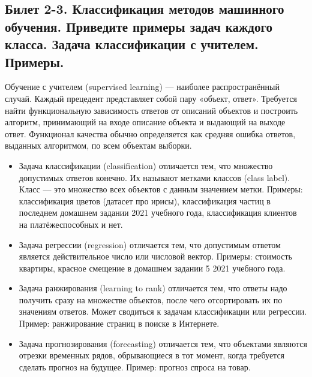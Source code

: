 \documentclass[a4paper, 12pt]{article}
\begin{document}
	\subsection*{Билет 2-3. Классификация методов машинного обучения. Приведите примеры задач каждого класса. Задача классификации с учителем. Примеры.}
	Обучение с учителем (supervised learning) — наиболее распространённый случай. Каждый прецедент представляет собой пару «объект, ответ». Требуется найти функциональную зависимость ответов от описаний объектов и построить алгоритм, принимающий на входе описание объекта и выдающий на выходе ответ. Функционал качества обычно определяется как средняя ошибка ответов, выданных алгоритмом, по всем объектам выборки.
	\begin{itemize}
	\item Задача классификации (classification) отличается тем, что множество допустимых ответов конечно. Их называют метками классов (class label). Класс — это множество всех объектов с данным значением метки. Примеры: классификация цветов (датасет про ирисы), классификация частиц в последнем домашнем задании 2021 учебного года, классификация клиентов на платёжеспособных и нет.
	\item Задача регрессии (regression) отличается тем, что допустимым ответом является действительное число или числовой вектор. Примеры: стоимость квартиры, красное смещение в домашнем задании 5 2021 учебного года.
	\item Задача ранжирования (learning to rank) отличается тем, что ответы надо получить сразу на множестве объектов, после чего отсортировать их по значениям ответов. Может сводиться к задачам классификации или регрессии. Пример: ранжирование страниц в поиске в Интернете.
	\item Задача прогнозирования (forecasting) отличается тем, что объектами являются отрезки временных рядов, обрывающиеся в тот момент, когда требуется сделать прогноз на будущее. Пример: прогноз спроса на товар.
	\end{itemize}
\end{document}
